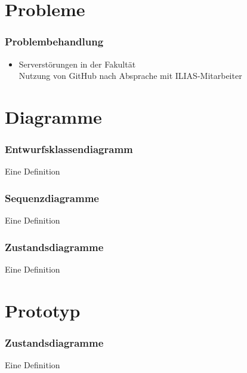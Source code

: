 \documentclass{beamer}
\begin{document}
\section{Probleme}
\begin{frame} %
  \frametitle{Problembehandlung} %
  \begin{FusionForge} %
    \begin{itemize}
    		\item Serverstörungen in der Fakultät \\
    		\to Nutzung von GitHub nach Absprache mit ILIAS-Mitarbeiter
    \end{itemize}
  \end{FusionForge}
\end{frame}

\section{Diagramme}
\begin{frame} %
  \frametitle{Entwurfsklassendiagramm} %
  \begin{Definition} %
    Eine Definition
  \end{Definition}
\end{frame}

\begin{frame} %
  \frametitle{Sequenzdiagramme} %
  \begin{Definition} %
    Eine Definition
  \end{Definition}
\end{frame}

\begin{frame} %
  \frametitle{Zustandsdiagramme} %
  \begin{Definition} %
    Eine Definition
  \end{Definition}
\end{frame}

\section{Prototyp}
\begin{frame} %
  \frametitle{Zustandsdiagramme} %
  \begin{Definition} %
    Eine Definition
  \end{Definition}
\end{frame}
\end{document}
